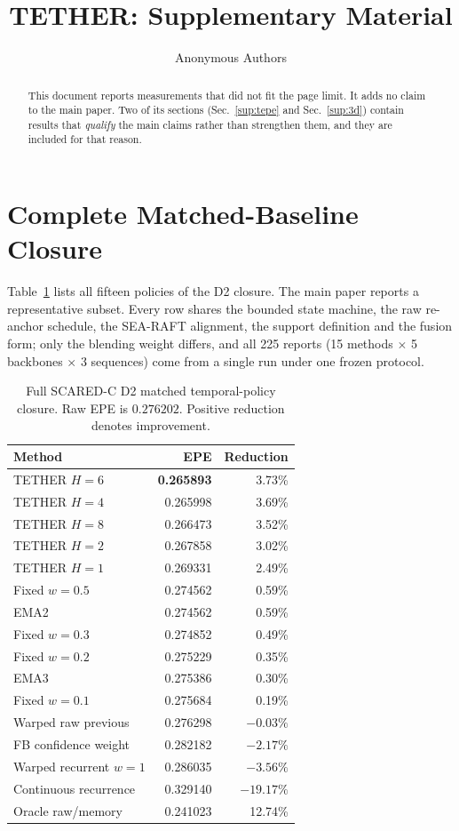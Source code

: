 \documentclass[letterpaper,10pt,conference]{ieeeconf}
\title{\textbf{TETHER: Supplementary Material}}
\author{Anonymous Authors}
\newcommand{\steer}{\textsc{TETHER}}
\begin{document}
\maketitle
\thispagestyle{empty}
\pagestyle{empty}

\begin{abstract}
This document reports measurements that did not fit the page limit. It
adds no claim to the main paper. Two of its sections
(Sec.~\ref{sup:tepe} and Sec.~\ref{sup:3d}) contain results that
\emph{qualify} the main claims rather than strengthen them, and they are
included for that reason.
\end{abstract}

\section{Complete Matched-Baseline Closure}
\label{sec:closure}

Table~\ref{sup:closure} lists all fifteen policies of the D2 closure.
The main paper reports a representative subset. Every row shares the
bounded state machine, the raw re-anchor schedule, the SEA-RAFT
alignment, the support definition and the fusion form; only the blending
weight differs, and all 225 reports (15 methods $\times$ 5 backbones
$\times$ 3 sequences) come from a single run under one frozen protocol.

\begin{table}[htb]
\centering
\small
\caption{Full SCARED-C D2 matched temporal-policy closure.
Raw EPE is $0.276202$. Positive reduction denotes improvement.}
\label{sup:closure}
\begin{tabular}{lrr}
\toprule
Method & EPE & Reduction \\
\midrule
\steer{} $H=6$ & \textbf{0.265893} & 3.73\% \\
\steer{} $H=4$ & 0.265998 & 3.69\% \\
\steer{} $H=8$ & 0.266473 & 3.52\% \\
\steer{} $H=2$ & 0.267858 & 3.02\% \\
\steer{} $H=1$ & 0.269331 & 2.49\% \\
\midrule
Fixed $w=0.5$ & 0.274562 & 0.59\% \\
EMA2          & 0.274562 & 0.59\% \\
Fixed $w=0.3$ & 0.274852 & 0.49\% \\
Fixed $w=0.2$ & 0.275229 & 0.35\% \\
EMA3          & 0.275386 & 0.30\% \\
Fixed $w=0.1$ & 0.275684 & 0.19\% \\
Warped raw previous    & 0.276298 & $-0.03\%$ \\
FB confidence weight   & 0.282182 & $-2.17\%$ \\
Warped recurrent $w=1$ & 0.286035 & $-3.56\%$ \\
Continuous recurrence  & 0.329140 & $-19.17\%$ \\
\midrule
Oracle raw/memory & 0.241023 & 12.74\% \\
\bottomrule
\end{tabular}
\end{table}
\end{document}
